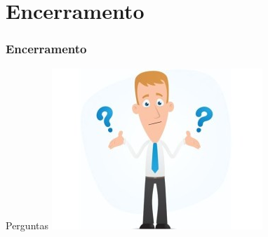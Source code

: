 \documentclass[]{beamer}
\begin{document}
	\section{Encerramento}
	\begin{frame}[label=encerramento]
		\frametitle{Encerramento}
		\begin{block}{Perguntas}
			\centering
			\includegraphics[scale=0.6]{duvidas.jpg}\\
		\end{block}
	\end{frame}
\end{document}
